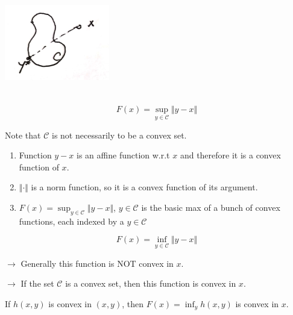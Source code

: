 \begin{example}
\begin{marginfigure}
	\centering
	\includegraphics[width=1.8in,height=1.8in]{figures/ch08/figure1104_1.png}
\end{marginfigure}

\begin{equation*}
F(x) = \sup_{y\in \mathcal{C}}\Vert y-x\Vert
\end{equation*}

Note that $\mathcal{C}$ is not necessarily to be a convex set. 

\begin{enumerate}
	\item Function $y-x$ is an affine function w.r.t $x$ and therefore it is a convex function of $x$.
	
	\item $\Vert\cdot\Vert$ is a norm function, so it is a convex function of its argument. 
	
	\item $F(x) = \sup_{y\in \mathcal{C}}\Vert y-x\Vert$, $y\in \mathcal{C}$ is the basic max of a bunch of convex functions, each indexed by a $y\in \mathcal{C}$
\end{enumerate}
\end{example}



\begin{example}
\begin{equation*}
F(x) =\inf_{y\in \mathcal{C}}\Vert y-x\Vert
\end{equation*}

$\rightarrow$ Generally this function is NOT convex in $x$.

$\rightarrow$ If the set $\mathcal{C}$ is a convex set, then this function is convex in $x$. 
\end{example}




\begin{theorem}
 If $h(x, y)$ is convex in $(x,y)$, then $F(x) = \inf_yh(x,y)$ is convex in $x$.
\end{theorem}

